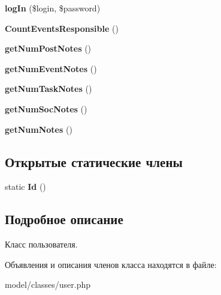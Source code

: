 \begin{DoxyCompactItemize}
{\bfseries log\+In} (\$login, \$password)
\item 
\mbox{\label{class_user_a5e2e988932fc4fdd67fbdad7f0c9c460}} 
{\bfseries Count\+Events\+Responsible} ()
\item 
\mbox{\label{class_user_a51abcf7a7d1795d49ccb73d7a8d9215e}} 
{\bfseries get\+Num\+Post\+Notes} ()
\item 
\mbox{\label{class_user_aa47914239932f3013b739ab0fde7ea08}} 
{\bfseries get\+Num\+Event\+Notes} ()
\item 
\mbox{\label{class_user_af3d29bcb812373e739f5e5a464fc9121}} 
{\bfseries get\+Num\+Task\+Notes} ()
\item 
\mbox{\label{class_user_a1b72d4fb43da8989ee6a980d6e19c9e2}} 
{\bfseries get\+Num\+Soc\+Notes} ()
\item 
\mbox{\label{class_user_aafa6d6f1112024a9c435946704002246}} 
{\bfseries get\+Num\+Notes} ()
\end{DoxyCompactItemize}
\subsection*{Открытые статические члены}
\begin{DoxyCompactItemize}
\item 
\mbox{\label{class_user_ad8bd251d2981e5ecefe88ba31d42a89c}} 
static {\bfseries Id} ()
\end{DoxyCompactItemize}


\subsection{Подробное описание}
Класс пользователя. 

Объявления и описания членов класса находятся в файле\+:\begin{DoxyCompactItemize}
\item 
model/classes/user.\+php\end{DoxyCompactItemize}
